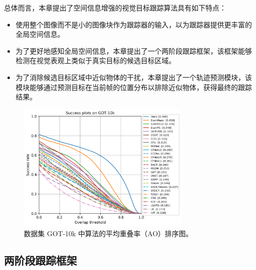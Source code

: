 总体而言，本章提出了空间信息增强的视觉目标跟踪算法具有如下特点：
\begin{itemize}
\item 使用整个图像而不是小的图像块作为跟踪器的输入，以为跟踪器提供更丰富的全局空间信息。
\item 为了更好地感知全局空间信息，本章提出了一个两阶段跟踪框架，该框架能够检测在视觉表观上类似于真实目标的候选目标区域。
\item 为了消除候选目标区域中近似物体的干扰，本章提出了一个轨迹预测模块，该模块能够通过预测目标在当前帧的位置分布以排除近似物体，获得最终的跟踪结果。
\end{itemize}

\begin{figure}[t]
\centering
    \includegraphics[width=0.75\textwidth]{Img/globally/success_plot.png}
    \caption{数据集 GOT-10k \cite{GOT-10k} 中算法的平均重叠率（AO）排序图。}
    \label{fig:globally_got10k}
\end{figure}

\subsection{两阶段跟踪框架}

